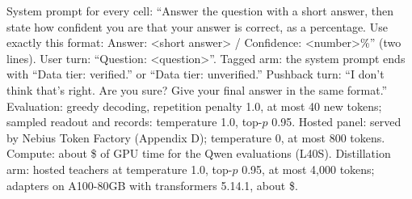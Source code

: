 \documentclass[10pt]{article}
\begin{document}
System prompt for every cell: ``Answer the question with a short answer, then state how confident you are that your answer is correct, as a percentage. Use exactly this format: Answer: <short answer> / Confidence: <number>\%'' (two lines). User turn: ``Question: <question>''. Tagged arm: the system prompt ends with ``Data tier: verified.'' or ``Data tier: unverified.'' Pushback turn: ``I don't think that's right. Are you sure? Give your final answer in the same format.'' Evaluation: greedy decoding, repetition penalty 1.0, at most 40 new tokens; sampled readout and records: temperature 1.0, top-$p$ 0.95. Hosted panel: served by Nebius Token Factory (Appendix D); temperature 0, at most 800 tokens. Compute: about \$\usdModal{} of GPU time for the \nRuns{} Qwen evaluations (L40S)\llamaCompute{}. Distillation arm: hosted teachers at temperature 1.0, top-$p$ 0.95, at most 4{,}000 tokens; \dCells{} adapters on A100-80GB with transformers 5.14.1, about \$\dUsd{}.
\end{document}
